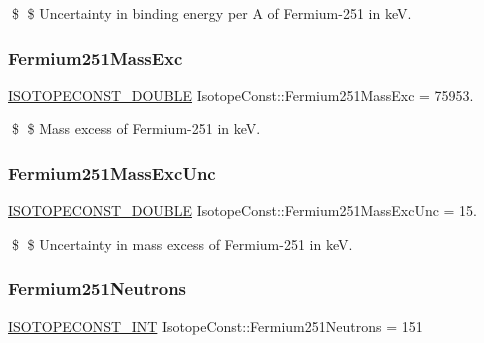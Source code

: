 \$ \$ Uncertainty in binding energy per A of Fermium-\/251 in keV. \mbox{\label{group___isotope_const-_fermium-_fm251_ga55f1a400a94872ae3c97445b7a90d77b}} 
\subsubsection{\texorpdfstring{Fermium251\+Mass\+Exc}{Fermium251MassExc}}
{\footnotesize\ttfamily \mbox{\hyperlink{group___isotope_const-_macros_ga8f45a7272ce02c0b4c65c44636ed719a}{I\+S\+O\+T\+O\+P\+E\+C\+O\+N\+S\+T\+\_\+\+D\+O\+U\+B\+LE}} Isotope\+Const\+::\+Fermium251\+Mass\+Exc = 75953.}

\$ \$ Mass excess of Fermium-\/251 in keV. \mbox{\label{group___isotope_const-_fermium-_fm251_ga10a0c455f48f83b154b847ac539bb8f6}} 
\subsubsection{\texorpdfstring{Fermium251\+Mass\+Exc\+Unc}{Fermium251MassExcUnc}}
{\footnotesize\ttfamily \mbox{\hyperlink{group___isotope_const-_macros_ga8f45a7272ce02c0b4c65c44636ed719a}{I\+S\+O\+T\+O\+P\+E\+C\+O\+N\+S\+T\+\_\+\+D\+O\+U\+B\+LE}} Isotope\+Const\+::\+Fermium251\+Mass\+Exc\+Unc = 15.}

\$ \$ Uncertainty in mass excess of Fermium-\/251 in keV. \mbox{\label{group___isotope_const-_fermium-_fm251_gaf647efa8bf811a017705330310972c07}} 
\subsubsection{\texorpdfstring{Fermium251\+Neutrons}{Fermium251Neutrons}}
{\footnotesize\ttfamily \mbox{\hyperlink{group___isotope_const-_macros_ga5f18360b3e99483a35c32d789e62621c}{I\+S\+O\+T\+O\+P\+E\+C\+O\+N\+S\+T\+\_\+\+I\+NT}} Isotope\+Const\+::\+Fermium251\+Neutrons = 151}

